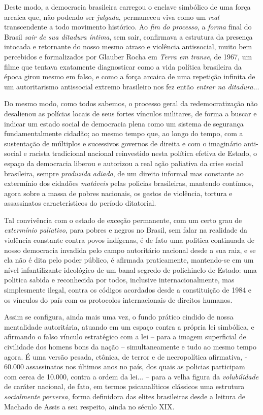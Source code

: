 Deste modo, a democracia brasileira carregou o enclave simbólico de uma
força arcaica que, não podendo ser \emph{julgada}, permaneceu viva como
um \emph{real} transcendente a todo movimento histórico. Ao \emph{fim do
processo}, a \emph{forma} final do Brasil \emph{sair de sua ditadura
íntima}, sem sair, confirmava a estrutura da presença intocada e
retornante do nosso mesmo atraso e violência antissocial, muito bem
percebidos e formalizados por Glauber Rocha em \emph{Terra em transe},
de 1967, um filme que tentava exatamente diagnosticar como a vida
política brasileira da época girou mesmo em falso, e como a força
arcaica de uma repetição infinita de um autoritarismo antissocial
extremo brasileiro nos fez então \emph{entrar na ditadura}...

Do mesmo modo, como todos sabemos, o processo geral da redemocratização
não desalienou as polícias locais de seus fortes vínculos militares, de
forma a buscar e indicar um estado social de democracia plena como um
sistema de segurança fundamentalmente cidadão; ao mesmo tempo que, ao
longo do tempo, com a sustentação de múltiplos e sucessivos governos de
direita e com o imaginário anti-social e racista tradicional nacional
reinvestido nesta política efetiva de Estado, o espaço da democracia
liberou e autorizou a real ação paliativa da crise social brasileira,
sempre \emph{produzida} \emph{adiada}, de um direito informal mas
constante ao extermínio dos cidadões \emph{matáveis} pelas policias
brasileiras, mantendo contínuos, agora sobre a massa de pobres
nacionais, os gestos de violência, tortura e assassinatos
característicos do período ditatorial.

Tal convivência com o estado de exceção permanente, com um certo grau de
\emph{extermínio} \emph{paliativo}, para pobres e negros no Brasil, sem
falar na realidade da violência constante contra povos indígenas, é de
fato uma politica continuada de nosso democracia invadida pelo campo
autoritário nacional desde a sua raiz, e se ela não é dita pelo poder
público, é afirmada praticamente, mantendo-se em um nível infantilizante
ideológico de um banal segredo de polichinelo de Estado: uma politica
sabida e reconhecida por todos, inclusive internacionalmente, mas
simplesmente ilegal, contra os códigos acordados desde a constituição de
1984 e os vínculos do país com os protocolos internacionais de direitos
humanos.

Assim se configura, ainda mais uma vez, o fundo prático cindido de nossa
mentalidade autoritária, atuando em um espaço contra a própria lei
simbólica, e afirmando o falso vínculo estratégico com a lei -- para a
imagem superficial de civilidade dos homens bons da nação --
simultaneamente e tudo ao mesmo tempo agora. É uma versão pesada,
ctônica, de terror e de necropolítica afirmativa, - 60.000 assassinatos
nos últimos anos no país, dos quais as policias participam com cerca de
10.000, contra a ordem da lei... -- para a velha figura da
\emph{volubilidade} de caráter nacional, de fato, em termos
psicanalíticos clássicos uma estrutura \emph{socialmente}
\emph{perversa}, forma definidora das elites brasileiras desde a leitura
de Machado de Assis a seu respeito, ainda no século XIX.

